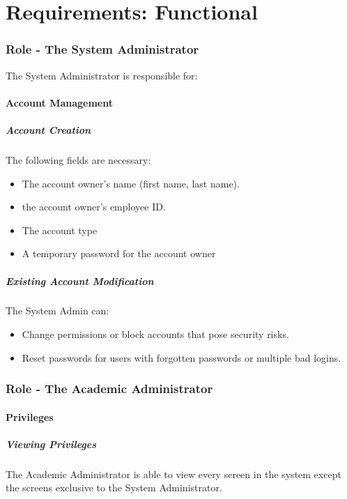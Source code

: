 \documentclass{article}
\begin{document}
\part{Requirements: Functional}
\section{Role - The System Administrator \label{SysAdmin}}
The System Administrator is responsible for:
\subsection{Account Management}
\subsubsection{Account Creation \label{Account Creation}}
The following fields are necessary:
\begin{itemize}
  \item The account owner's name (first name, last name).
  \item the account owner's employee ID.
  \item The account type
  \item A temporary password for the account owner
\end{itemize}
\subsubsection{Existing Account Modification \label{AccountMod}}
The System Admin can:
\begin{itemize}
  \item Change permissions or block accounts that pose security risks.
  \item Reset passwords for users with forgotten passwords or multiple bad logins.
\end{itemize}

\section{Role - The Academic Administrator \label{AcAdmin}}
\subsection{Privileges}
\subsubsection{Viewing Privileges}
The Academic Administrator is able to view every screen in the system except the screens exclusive to the System Administrator.
\end{document}
